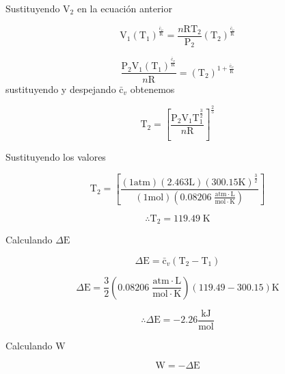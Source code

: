 \documentclass[12pt]{article}
\begin{document}
Sustituyendo $\mathrm{V}_2$ en la ecuación anterior

\begin{displaymath}
	\mathrm{V}_1(\mathrm{T}_1)^{\frac{\mathrm{\bar{c}}_v}{\mathrm{R}}}=\frac{n\mathrm{R}\mathrm{T}_2}{\mathrm{P}_2}(\mathrm{T}_2)^{\frac{\mathrm{\bar{c}}_v}{\mathrm{R}}}
\end{displaymath}

\begin{displaymath}
	\frac{\mathrm{P}_2\mathrm{V}_1(\mathrm{T}_1)^{\frac{\mathrm{\bar{c}}_v}{\mathrm{R}}}}{n\mathrm{R}}=(\mathrm{T}_2)^{1+\frac{\mathrm{\bar{c}}_v}{\mathrm{R}}}
\end{displaymath}
\newpage
sustituyendo y despejando $\mathrm{\bar{c}}_v$ obtenemos

\begin{displaymath}
	\mathrm{T}_2=\left[ \frac{\mathrm{P}_2\mathrm{V}_1\mathrm{T}_1^{\frac{3}{2}}}{n\mathrm{R}} \right]^{\frac{2}{5}}
\end{displaymath}

Sustituyendo los valores

\begin{displaymath}
	\mathrm{T}_2=\left[ \frac{(1\mathrm{atm})(2.463\mathrm{L})(300.15\mathrm{K})^{\frac{3}{2}}}{(1\mathrm{mol})(0.08206\; \frac{\mathrm{atm}\cdot\mathrm{L}}{\mathrm{mol}\cdot\mathrm{K}})} \right]
\end{displaymath}

\begin{displaymath}
	\therefore\mathrm{T}_2= 119.49\;\mathrm{K}
\end{displaymath}

Calculando $\Delta\mathrm{E}$

\begin{displaymath}
	\Delta\mathrm{E}=\mathrm{\bar{c}}_v(\mathrm{T}_2-\mathrm{T}_1)
\end{displaymath}

\begin{displaymath}
	\Delta\mathrm{E}=\frac{3}{2}\left( 0.08206\; \frac{\mathrm{atm}\cdot\mathrm{L}}{\mathrm{mol}\cdot\mathrm{K}} \right) \left(119.49-300.15\right)\mathrm{K}
\end{displaymath}

\begin{displaymath}
	\therefore\Delta\mathrm{E}=-2.26\frac{\mathrm{kJ}}{\mathrm{mol}}
\end{displaymath}

Calculando $\mathrm{W}$

\begin{displaymath}
	\mathrm{W}=-\Delta\mathrm{E}
\end{displaymath}
\end{document}
